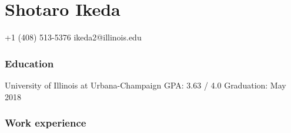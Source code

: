 \documentclass{tccv}
\begin{document}
\part{Shotaro Ikeda}

{+1 (408) 513-5376}
{ikeda2@illinois.edu}

\section{Education}

\begin{yearlist}

  {University of Illinois at  \newline Urbana-Champaign}
  {GPA: 3.63 / 4.0}
  {Graduation: May 2018}

\end{yearlist}

\section{Work experience}
\end{document}
